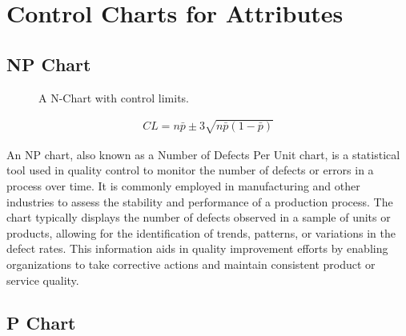 \documentclass[
  a4paper,
]{scrbook}
\begin{document}
\section{Control Charts for
Attributes}\label{control-charts-for-attributes}

\subsection{NP Chart}\label{np-chart}

\begin{figure}[H]


\caption{\label{fig-np-chart}A N-Chart with control limits.}

\end{figure}%

\begin{align}
CL = n\bar{p} \pm 3\sqrt{n\bar{p}(1-\bar{p})}
\end{align}

An NP chart, also known as a Number of Defects Per Unit chart, is a
statistical tool used in quality control to monitor the number of
defects or errors in a process over time. It is commonly employed in
manufacturing and other industries to assess the stability and
performance of a production process. The chart typically displays the
number of defects observed in a sample of units or products, allowing
for the identification of trends, patterns, or variations in the defect
rates. This information aids in quality improvement efforts by enabling
organizations to take corrective actions and maintain consistent product
or service quality.

\subsection{P Chart}\label{p-chart}
\end{document}
